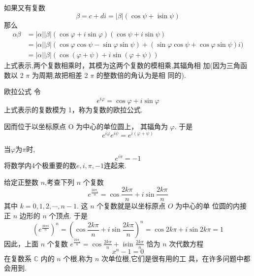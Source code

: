 \documentclass[13pt,fontset=mac]{ctexbeamer}
\begin{document}
\begin{frame}
	如果又有复数
	\[
	\beta=c+d {i}=|\beta|(\cos \psi+\operatorname{isin} \psi)
	\]
	那么
	\[
	\begin{aligned}
		\alpha \beta &=|\alpha||\beta|(\cos \varphi+i \operatorname{sin} \varphi)(\cos \psi+ i \operatorname{sin} \psi) \\
		&=|\alpha||\beta|(\cos \varphi \cos \psi-\sin \varphi \sin \psi)+(\sin \varphi \cos \psi+\cos \varphi \sin \psi) {i}) \\
		&=|\alpha||\beta|(\cos (\varphi+\psi)+i \operatorname{sin}(\varphi+\psi))
	\end{aligned}
	\]
	上式表示,两个复数相乘时，其模为这两个复数的模相乘,其辐角相 加(因为三角函数以 2 $\pi$ 为周期,故把相差 2 $\pi$ 的整数倍的角认为是相 同的).
\end{frame}

\begin{frame}{欧拉公式}
	令
	\[
	{e}^{{i} \varphi}=\cos \varphi+{i} \sin \varphi
	\]
	上式表示的复数模为 1，称为复数的\alert{欧拉公式}.

	因而位于以坐标原点 O 为中心的单位圆上， 其辐角为 $\varphi$. 于是
	\[
	{e}^{{i} \varphi} {e}^{{i} \psi}={e}^{{i}(\varphi+\psi)}
	\]


	当$\varphi$为$\pi$时, $$ e^{i\pi }=-1$$
	将数学内4个极重要的数$e, i, \pi, -1 $连起来.
\end{frame}



\begin{frame}
	给定正整数 $n$,考查下列 $n$ 个复数
	\[
	{e}^{\frac{2 k \pi_{{i}}}{n}}=\cos \frac{2 k \pi}{n}+i\operatorname{sin} \frac{2 k \pi}{n}
	\]
	其中 $k=0,1,2, \cdots, n-1.$ 这 $n$ 个复数就是以坐标原点 $O$ 为中心的单 位圆的内接正 $n$ 边形的 $n$ 个顶点.
	于是
	\[
	\left({e}^{\frac{2 {k\pi i}}{n}}\right)^{n}=\left(\cos \frac{2 k \pi}{n}+i \operatorname{sin} \frac{2 k \pi}{n}\right)^{n}=\cos 2 k \pi+{i} \sin 2 k \pi=1
	\]
	因此，上面 $n$ 个复数 ${e}^{\frac{2 k \pi_{{i}}}{n}}=\cos \frac{2 k \pi}{n}+$ isin $\frac{2 k \pi}{n}$ 恰为 $n$ 次代数方程 $$x^{n}-1=0$$ 在复数系 $\mathbb{C}$ 内的 $n$ 个根,称为 $n$ 次单位根,它们是很有用的工
	具，在许多问题中都会用到.
\end{frame}

%
%
%
%
\end{document}
